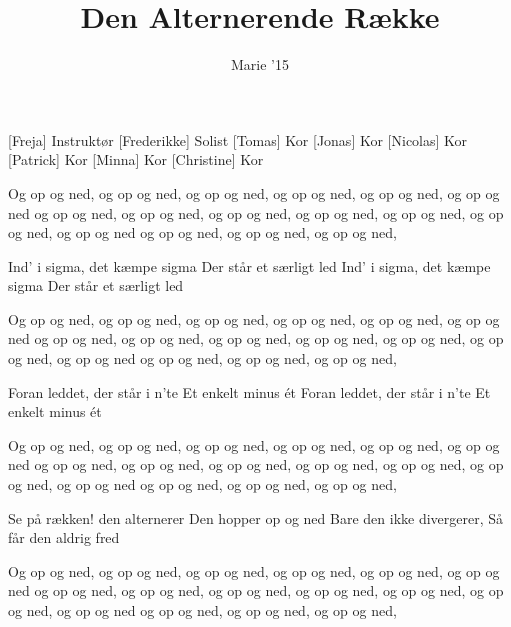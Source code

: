 \documentclass[a4paper,11pt]{article}
\title{Den Alternerende Række}
\author{Marie '15}
\begin{document}
\maketitle

\begin{roles}
[Freja] Instruktør
[Frederikke] Solist
[Tomas] Kor
[Jonas] Kor
[Nicolas] Kor
[Patrick] Kor
[Minna] Kor
[Christine] Kor
\end{roles}

\begin{song}

 Og op og ned, og op og ned, 
og op og ned, og op og ned, og op og ned, og op og ned 
og op og ned, og op og ned, og op og ned, 
og op og ned, og op og ned, og op og ned, og op og ned 
og op og ned, og op og ned, og op og ned,

 Ind’ i sigma, det kæmpe sigma
Der står et særligt led
Ind’ i sigma, det kæmpe sigma
Der står et særligt led

 Og op og ned, og op og ned, 
og op og ned, og op og ned, og op og ned, og op og ned 
og op og ned, og op og ned, og op og ned, 
og op og ned, og op og ned, og op og ned, og op og ned 
og op og ned, og op og ned, og op og ned,

 Foran leddet, der står i n’te
Et enkelt minus ét
Foran leddet, der står i n’te
Et enkelt minus ét

 Og op og ned, og op og ned, 
og op og ned, og op og ned, og op og ned, og op og ned 
og op og ned, og op og ned, og op og ned, 
og op og ned, og op og ned, og op og ned, og op og ned 
og op og ned, og op og ned, og op og ned,

 Se på rækken! den alternerer
Den hopper op og ned 
Bare den ikke divergerer,
Så får den aldrig fred

 Og op og ned, og op og ned, 
og op og ned, og op og ned, og op og ned, og op og ned 
og op og ned, og op og ned, og op og ned, 
og op og ned, og op og ned, og op og ned, og op og ned 
og op og ned, og op og ned, og op og ned,
\end{song}
\end{document}
